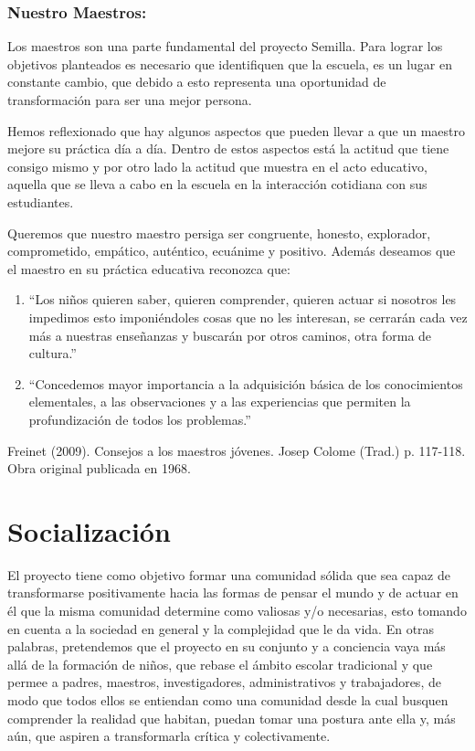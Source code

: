 \documentclass[10pt,letterpaper,oneside]{book}
\begin{document}
\subsection{Nuestro Maestros:}

Los maestros son una parte fundamental del proyecto Semilla. Para lograr los objetivos planteados es necesario que identifiquen que la escuela, es un lugar en constante cambio, que debido a esto representa una oportunidad de transformación para ser una mejor persona. 

Hemos reflexionado que hay algunos aspectos que pueden llevar a que un maestro mejore su práctica día a día. Dentro de estos aspectos está la actitud que tiene consigo mismo y por otro lado la actitud que muestra en el acto educativo, aquella que se lleva a cabo en la escuela en la interacción cotidiana con sus estudiantes.

Queremos que nuestro maestro persiga ser congruente, honesto, explorador, comprometido, empático, auténtico, ecuánime y positivo. Además deseamos que el maestro en su práctica educativa reconozca que: 
\begin{enumerate}
\item ``Los niños quieren saber, quieren comprender, quieren actuar si nosotros les impedimos esto imponiéndoles cosas que no les interesan, se cerrarán cada vez más a nuestras enseñanzas y buscarán por otros caminos, otra forma de cultura.''
\item ``Concedemos mayor importancia a la adquisición básica de los conocimientos elementales, a las observaciones y a las experiencias que permiten la profundización de todos los problemas.''
\end{enumerate}

Freinet (2009). Consejos a los maestros jóvenes. 
Josep Colome (Trad.) p. 117-118. Obra original publicada en 1968.

\chapter{Socialización}

El proyecto tiene como objetivo formar una comunidad sólida que sea capaz de transformarse positivamente hacia las formas de pensar el mundo y de actuar en él que la misma comunidad determine como valiosas y/o necesarias, esto tomando en cuenta a la sociedad en general y la complejidad que le da vida. En otras palabras, pretendemos que el proyecto en su conjunto y a conciencia vaya más allá de la formación de niños, que rebase el ámbito escolar tradicional y que permee a padres, maestros, investigadores, administrativos y trabajadores, de modo que todos ellos se entiendan como una comunidad desde la cual busquen comprender la realidad que habitan, puedan tomar una postura ante ella y, más aún, que aspiren a transformarla crítica y colectivamente. 
\end{document}
